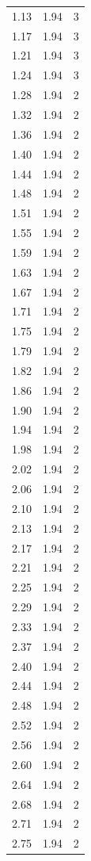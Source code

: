 \begin{longtable}{lrr}
  1.13 & 1.94 & 3 \\
  1.17 & 1.94 & 3 \\
  1.21 & 1.94 & 3 \\
  1.24 & 1.94 & 3 \\
  1.28 & 1.94 & 2 \\
  1.32 & 1.94 & 2 \\
  1.36 & 1.94 & 2 \\
  1.40 & 1.94 & 2 \\
  1.44 & 1.94 & 2 \\
  1.48 & 1.94 & 2 \\
  1.51 & 1.94 & 2 \\
  1.55 & 1.94 & 2 \\
  1.59 & 1.94 & 2 \\
  1.63 & 1.94 & 2 \\
  1.67 & 1.94 & 2 \\
  1.71 & 1.94 & 2 \\
  1.75 & 1.94 & 2 \\
  1.79 & 1.94 & 2 \\
  1.82 & 1.94 & 2 \\
  1.86 & 1.94 & 2 \\
  1.90 & 1.94 & 2 \\
  1.94 & 1.94 & 2 \\
  1.98 & 1.94 & 2 \\
  2.02 & 1.94 & 2 \\
  2.06 & 1.94 & 2 \\
  2.10 & 1.94 & 2 \\
  2.13 & 1.94 & 2 \\
  2.17 & 1.94 & 2 \\
  2.21 & 1.94 & 2 \\
  2.25 & 1.94 & 2 \\
  2.29 & 1.94 & 2 \\
  2.33 & 1.94 & 2 \\
  2.37 & 1.94 & 2 \\
  2.40 & 1.94 & 2 \\
  2.44 & 1.94 & 2 \\
  2.48 & 1.94 & 2 \\
  2.52 & 1.94 & 2 \\
  2.56 & 1.94 & 2 \\
  2.60 & 1.94 & 2 \\
  2.64 & 1.94 & 2 \\
  2.68 & 1.94 & 2 \\
  2.71 & 1.94 & 2 \\
  2.75 & 1.94 & 2 \\

\end{longtable}
